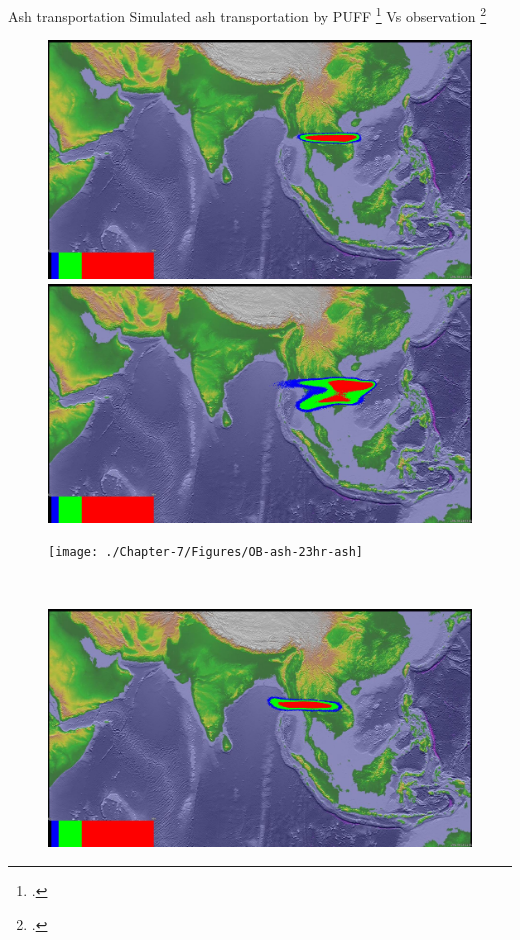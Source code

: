 \documentclass{beamer}
\begin{document}
\begin{frame}{Ash transportation}
Simulated ash transportation by PUFF \footcite{searcy1998puff} Vs observation \footcite{guo2004particles}
\begin{figure}[!htb]
    \centering
    \begin{minipage}{.288\textwidth}
        \centering
        \includegraphics[width=0.99 \textwidth]{./Chapter-7/Figures/bent-23hr-ash}
    \end{minipage}%
    \begin{minipage}{.288\textwidth}
        \centering
        \includegraphics[width=0.99 \textwidth]{./Chapter-7/Figures/SPH-Plume-23hr-ash}
    \end{minipage}%
    \begin{minipage}{.288\textwidth}
        \centering
        \texttt{[image: ./Chapter-7/Figures/OB-ash-23hr-ash]}
    \end{minipage}%
    \\
        \begin{minipage}{.288\textwidth}
        \centering
        \includegraphics[width=0.99 \textwidth]{./Chapter-7/Figures/bent-31hr-ash}

\end{minipage}
\end{figure}
\end{frame}
\end{document}
